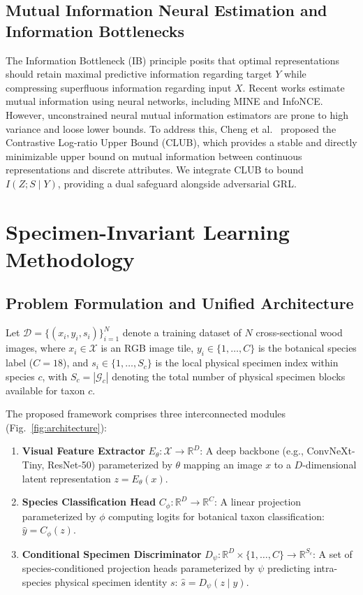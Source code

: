 \documentclass[a4paper,fleqn]{cas-sc}
\begin{document}
\subsection{Mutual Information Neural Estimation and Information Bottlenecks}
The Information Bottleneck (IB) principle posits that optimal representations should retain maximal predictive information regarding target $Y$ while compressing superfluous information regarding input $X$. Recent works estimate mutual information using neural networks, including MINE and InfoNCE. However, unconstrained neural mutual information estimators are prone to high variance and loose lower bounds. To address this, Cheng et al.~\cite{cheng2020club} proposed the Contrastive Log-ratio Upper Bound (CLUB), which provides a stable and directly minimizable upper bound on mutual information between continuous representations and discrete attributes. We integrate CLUB to bound $I(Z; S \mid Y)$, providing a dual safeguard alongside adversarial GRL.

\section{Specimen-Invariant Learning Methodology}
\label{sec:method}

\subsection{Problem Formulation and Unified Architecture}
Let $\mathcal{D} = \{(x_i, y_i, s_i)\}_{i=1}^N$ denote a training dataset of $N$ cross-sectional wood images, where $x_i \in \mathcal{X}$ is an RGB image tile, $y_i \in \{1, \dots, C\}$ is the botanical species label ($C=18$), and $s_i \in \{1, \dots, S_c\}$ is the local physical specimen index within species $c$, with $S_c = |\mathcal{G}_c|$ denoting the total number of physical specimen blocks available for taxon $c$.

The proposed framework comprises three interconnected modules (Fig.~\ref{fig:architecture}):
\begin{enumerate}
    \item \textbf{Visual Feature Extractor} $E_\theta: \mathcal{X} \to \mathbb{R}^D$: A deep backbone (e.g., ConvNeXt-Tiny, ResNet-50) parameterized by $\theta$ mapping an image $x$ to a $D$-dimensional latent representation $z = E_\theta(x)$.
    \item \textbf{Species Classification Head} $C_\phi: \mathbb{R}^D \to \mathbb{R}^C$: A linear projection parameterized by $\phi$ computing logits for botanical taxon classification: $\hat{y} = C_\phi(z)$.
    \item \textbf{Conditional Specimen Discriminator} $D_\psi: \mathbb{R}^D \times \{1,\dots,C\} \to \mathbb{R}^{S_c}$: A set of species-conditioned projection heads parameterized by $\psi$ predicting intra-species physical specimen identity $s$: $\hat{s} = D_\psi(z \mid y)$.
\end{enumerate}
\end{document}
